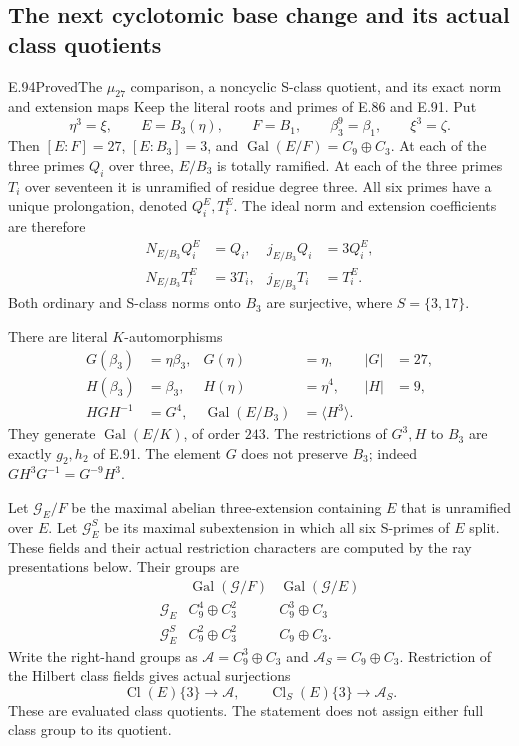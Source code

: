 \subsection{The next cyclotomic base change and its actual class quotients}

\begin{statement}{E.94}{Proved}{The \(\mu_{27}\) comparison, a noncyclic S-class quotient, and its exact norm and extension maps}
Keep the literal roots and primes of E.86 and E.91. Put
\[
 \eta^3=\xi,\qquad
 E=B_3(\eta),\qquad F=B_1,\qquad
 \beta_3^9=\beta_1,\qquad \xi^3=\zeta .
 \tag{E94.1}
\]
Then \([E:F]=27\), \([E:B_3]=3\), and
\(\operatorname{Gal}(E/F)=C_9\oplus C_3\).
At each of the three primes \(Q_i\) over three,
\(E/B_3\) is totally ramified. At each of the three
primes \(T_i\) over seventeen it is unramified of
residue degree three. All six primes have a unique
prolongation, denoted \(Q_i^E,T_i^E\). The ideal
norm and extension coefficients are therefore
\[
 \begin{aligned}
 N_{E/B_3}Q_i^E&=Q_i,&j_{E/B_3}Q_i&=3Q_i^E,\\
 N_{E/B_3}T_i^E&=3T_i,&j_{E/B_3}T_i&=T_i^E .
 \end{aligned}
 \tag{E94.2}
\]
Both ordinary and S-class norms onto \(B_3\) are
surjective, where \(S=\{3,17\}\).

There are literal \(K\)-automorphisms
\[
 \begin{aligned}
 G(\beta_3)&=\eta\beta_3,&G(\eta)&=\eta,& |G|&=27,\\
 H(\beta_3)&=\beta_3,&H(\eta)&=\eta^4,& |H|&=9,\\
 HGH^{-1}&=G^4,&
 \operatorname{Gal}(E/B_3)&=\langle H^3\rangle .
 \end{aligned}
 \tag{E94.3}
\]
They generate \(\operatorname{Gal}(E/K)\), of order
\(243\). The restrictions of \(G^3,H\) to \(B_3\)
are exactly \(g_2,h_2\) of E.91. The element \(G\)
does not preserve \(B_3\); indeed
\(GH^3G^{-1}=G^{-9}H^3\).

Let \(\mathcal G_E/F\) be the maximal abelian
three-extension containing \(E\) that is unramified
over \(E\). Let \(\mathcal G_E^S\) be its maximal
subextension in which all six S-primes of \(E\)
split. These fields and their actual restriction
characters are computed by the ray presentations
below. Their groups are
\[
 \begin{array}{c|c|c}
 &\operatorname{Gal}(\mathcal G/F)
      &\operatorname{Gal}(\mathcal G/E)\\ \hline
 \mathcal G_E&C_9^4\oplus C_3^2&C_9^3\oplus C_3\\
 \mathcal G_E^S&C_9^2\oplus C_3^2&C_9\oplus C_3 .
 \end{array}
 \tag{E94.4}
\]
Write the right-hand groups as
\(\mathcal A=C_9^3\oplus C_3\) and
\(\mathcal A_S=C_9\oplus C_3\). Restriction of
the Hilbert class fields gives actual surjections
\[
 \operatorname{Cl}(E)\{3\}\longrightarrow\mathcal A,
 \qquad
 \operatorname{Cl}_S(E)\{3\}\longrightarrow\mathcal A_S .
 \tag{E94.5}
\]
These are evaluated class quotients. The statement
does not assign either full class group to its quotient.


\end{statement}
